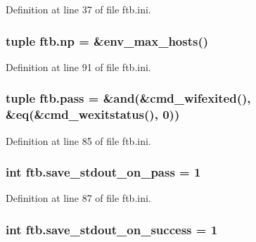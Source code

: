 Definition at line 37 of file ftb.\-ini.

\hypertarget{namespaceftb_a98d035fcaf3e0ad500d4398f3175857c}{
\subsubsection[{np}]{\setlength{\rightskip}{0pt plus 5cm}tuple ftb.\-np = \&env\-\_\-max\-\_\-hosts()}}\label{namespaceftb_a98d035fcaf3e0ad500d4398f3175857c}


Definition at line 91 of file ftb.\-ini.

\hypertarget{namespaceftb_a6835e8ccf2dcf3a64662b94ab7dc21dc}{
\subsubsection[{pass}]{\setlength{\rightskip}{0pt plus 5cm}tuple ftb.\-pass = \&and(\&cmd\-\_\-wifexited(), \&eq(\&cmd\-\_\-wexitstatus(), 0))}}\label{namespaceftb_a6835e8ccf2dcf3a64662b94ab7dc21dc}


Definition at line 85 of file ftb.\-ini.

\hypertarget{namespaceftb_ae7093ee70b2bbcabcc07887556559782}{
\subsubsection[{save\-\_\-stdout\-\_\-on\-\_\-pass}]{\setlength{\rightskip}{0pt plus 5cm}int ftb.\-save\-\_\-stdout\-\_\-on\-\_\-pass = 1}}\label{namespaceftb_ae7093ee70b2bbcabcc07887556559782}


Definition at line 87 of file ftb.\-ini.

\hypertarget{namespaceftb_a1ec5d4a20c1eb705891e7dd81a73cd7f}{
\subsubsection[{save\-\_\-stdout\-\_\-on\-\_\-success}]{\setlength{\rightskip}{0pt plus 5cm}int ftb.\-save\-\_\-stdout\-\_\-on\-\_\-success = 1}}\label{namespaceftb_a1ec5d4a20c1eb705891e7dd81a73cd7f}



